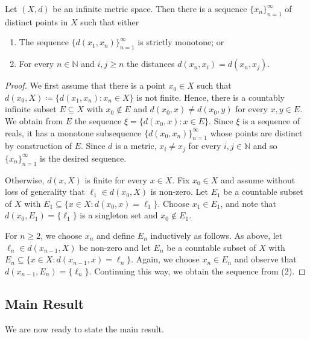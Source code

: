\begin{lemma}
Let \( (X, d) \) be an infinite metric space. Then there is a sequence \( \{ x_{n}  \}_{n = 1} ^{\infty}  \) of distinct points in \( X \) such that either
\begin{enumerate}[leftmargin = 1.2cm]
	\item The sequence \( \{ d(x_1, x_{n} ) \}_{n = 1} ^{\infty}  \) is strictly monotone; or
	\item For every \( n \in \mathbb{N}  \) and \( i,j \geq n \) the distances \( d(x_{n} , x_{i} ) = d(x_{n} , x_{j} ) \).
	
\end{enumerate}
\end{lemma}
\begin{proof}
We first assume that there is a point \( x_0 \in X \) such that \( d(x_0, X) \coloneqq \{ d(x_1, x_{n} ) : x_{n} \in X \}  \) is not finite. Hence, there is a countably infinite subset \( E \subseteq X \) with \( x_0 \notin E \) and \( d(x_0, x) \neq d(x_0, y) \) for every \( x,y \in E \). We obtain from \( E \) the sequence \( \xi = \{ d(x_0, x) : x \in E \}  \). Since \( \xi \) is a sequence of reals, it has a monotone subsequence \( \{ d(x_0, x_{n} ) \}_{n=1} ^{\infty} \) whose points are distinct by construction of \( E \). Since \( d \) is a metric, \( x_{i} \neq x_{j}  \) for every \( i,j \in \mathbb{N}  \) and so \( \{ x_{n}  \}_{n = 1} ^{\infty}  \) is the desired sequence.

Otherwise, \( d(x, X) \) is finite for every \( x \in X \). Fix \( x_0 \in X \) and assume without loss of generality that \( \ell_1 \in d(x_0, X)\) is non-zero. Let \( E_1 \) be a countable subset of \( X \) with \(E_1 \subseteq  \{ x \in X : d(x_0, x) = \ell_1 \}. \) Choose \( x_1 \in E_1 \), and note that \( d(x_0, E_1) = \{ \ell_1 \} \) is a singleton set and \( x_0 \notin E_1 \). 

For \( n \geq 2 \), we choose \( x_{n}  \) and define \( E_{n}  \) inductively as follows. As above, let \( \ell_{n} \in d(x_{n-1} , X) \) be non-zero and let \( E_{n}  \) be a countable subset of \( X \) with \( E_{n} \subseteq \{ x \in X : d(x_{n-1} , x) = \ell_{n} \} . \) Again, we choose \( x_{n} \in E_{n}  \) and observe that \( d(x_{n-1} , E_{n} ) = \{ \ell_{n}  \}  \). Continuing this way, we obtain the sequence from (2).
\end{proof}
\subsection{Main Result} We are now ready to state the main result.


